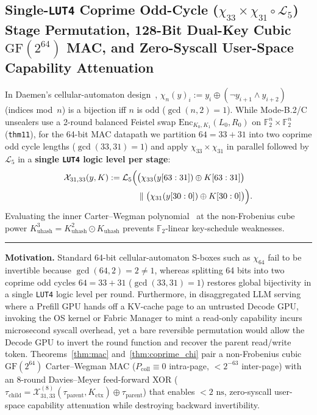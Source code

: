 \documentclass[10pt,twocolumn]{article}
\makeatletter
\newif\ifspecintwocol \specintwocolfalse
\newif\ifspecresume   \specresumefalse
\newcommand{\StopTwoCol}{%
  \if@twocolumn
    \onecolumn
    \global\specintwocolfalse
    \let\spec@next\@empty
  \else
    \ifspecintwocol
      \global\specintwocolfalse
      \def\spec@next{\end{multicols}}%
    \else
      \let\spec@next\@empty
    \fi
  \fi
  \spec@next
}
\newcommand{\BeginConnesPlate}{%
  \if@twocolumn
    \onecolumn
    \global\specresumetrue
    \let\spec@platepre\@empty
  \else
    \ifspecintwocol
      \global\specresumetrue
      \let\spec@platepre\StopTwoCol
    \else
      \global\specresumefalse
      \let\spec@platepre\@empty
    \fi
  \fi
  \spec@platepre
  \par\vspace{4pt}\noindent\textcolor{black!25}{\rule{\textwidth}{0.4pt}}\par\vspace{3pt}%
}
\theoremstyle{spectralthm}
\makeatother
\begin{document}
\subsection{Single-\texorpdfstring{\texttt{LUT4}}{LUT4} Coprime Odd-Cycle (\texorpdfstring{$\chi_{33} \times \chi_{31} \circ \mathcal{L}_5$}{chi\_33 x chi\_31 o L\_5}) Stage Permutation, 128-Bit Dual-Key Cubic \texorpdfstring{$\mathrm{GF}(2^{64})$}{GF(2\^64)} MAC, and Zero-Syscall User-Space Capability Attenuation}
In Daemen's cellular-automaton design~\cite{daemen1995cipher}, $\chi_n(y)_i := y_i \oplus (\neg y_{i+1} \wedge y_{i+2})$ (indices mod~$n$) is a bijection iff $n$ is odd ($\gcd(n,2) = 1$). While Mode-B.2/C unsealers use a 2-round balanced Feistel swap $\mathrm{Enc}_{K_0,K_1}(L_0,R_0)$ on $\mathbb{F}_2^n \times \mathbb{F}_2^n$ (\texttt{thm11}), for the 64-bit MAC datapath we partition $64 = 33 + 31$ into two coprime odd cycle lengths ($\gcd(33,31) = 1$) and apply $\chi_{33} \times \chi_{31}$ in parallel followed by $\mathcal{L}_5$ in a \textbf{single \texttt{LUT4} logic level per stage}:
\begin{equation}
\label{eq:coprime_chi}
\begin{aligned}
\mathcal{X}_{31,33}(y, K) := \mathcal{L}_5\Bigl(&\bigl(\chi_{33}(y[63:31]) \oplus K[63:31]\bigr)\\
&\parallel \bigl(\chi_{31}(y[30:0]) \oplus K[30:0]\bigr)\Bigr).
\end{aligned}
\end{equation}
Evaluating the inner Carter--Wegman polynomial~\cite{carter1979universal} at the non-Frobenius cube power $K_{\mathrm{uhash}}^3 = K_{\mathrm{uhash}}^2 \odot K_{\mathrm{uhash}}$ prevents $\mathbb{F}_2$-linear key-schedule weaknesses.

\BeginConnesPlate
\noindent\textbf{Motivation.}\; Standard 64-bit cellular-automaton S-boxes such as $\chi_{64}$ fail to be invertible because $\gcd(64,2)=2 \neq 1$, whereas splitting 64 bits into two coprime odd cycles $64 = 33 + 31$ ($\gcd(33,31)=1$) restores global bijectivity in a single \texttt{LUT4} logic level per round. Furthermore, in disaggregated LLM serving where a Prefill GPU hands off a KV-cache page to an untrusted Decode GPU, invoking the OS kernel or Fabric Manager to mint a read-only capability incurs microsecond syscall overhead, yet a bare reversible permutation would allow the Decode GPU to invert the round function and recover the parent read/write token. Theorems~\ref{thm:mac} and~\ref{thm:coprime_chi} pair a non-Frobenius cubic $\mathrm{GF}(2^{64})$ Carter--Wegman MAC ($P_{\mathrm{coll}} \equiv 0$ intra-page, $<2^{-63}$ inter-page) with an 8-round Davies--Meyer feed-forward XOR ($\tau_{\mathrm{child}} = \mathcal{X}_{31,33}^{(8)}(\tau_{\mathrm{parent}}, K_{\mathrm{ctx}}) \oplus \tau_{\mathrm{parent}}$) that enables $<2\text{~ns}$, zero-syscall user-space capability attenuation while destroying backward invertibility.
\end{document}
